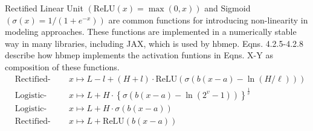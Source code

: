 \documentclass[a4paper,12pt]{article}
\begin{document}
    Rectified Linear Unit $\left(\text{ReLU}\left(x\right) = \max\left(0, x\right)\right)$ and Sigmoid $\left(\sigma\left(x\right) = 1 / \left(1 + e^{-x}\right)\right)$ are common functions for introducing non-linearity in modeling approaches. These functions are implemented in a numerically stable way in many libraries, including JAX, which is used by hbmep. Eqns. 4.2.5-4.2.8 describe how hbmep implements the activation funtions in Eqns. X-Y as composition of these functions.
    \begin{align*}
        &\text{Rectified-logistic} &\;\;&x \mapsto L - l + \left(H + l\right)\cdot\text{ReLU}\left(\sigma\left(b\left(x - a\right) - \ln\left(H / \ell\right)\right)\right)\tag{4.7.1}\\
        &\text{Logistic-5} &\;\;&x \mapsto L + H\cdot \left\{\sigma\left(b\left(x - a\right) - \ln\left(2^v - 1\right)\right)\right\}^{\frac1v} \tag{4.7.1}\\
        &\text{Logistic-4} &\;\;&x \mapsto L + H\cdot\sigma\left(b\left(x - a\right)\right)  \tag{4.7.2}\\
        &\text{Rectified-linear} &\;\;&x \mapsto L + \text{ReLU}\left(b\left(x - a\right)\right) \tag{4.7.3}\\
    \end{align*}
\end{document}
